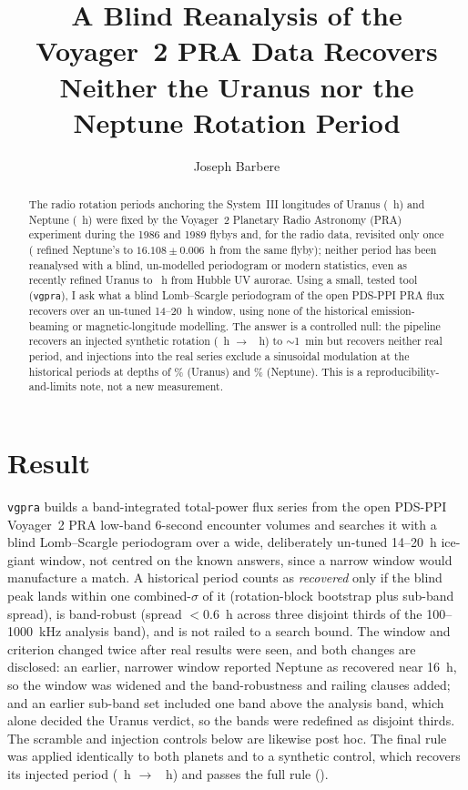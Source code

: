 \documentclass[RNAAS]{aastex631}
\newcommand{\code}[1]{\texttt{#1}}
\begin{document}
\title{A Blind Reanalysis of the Voyager~2 PRA Data Recovers Neither the Uranus nor the
Neptune Rotation Period}

\author[0009-0008-3289-4447]{Joseph Barbere}

\begin{abstract}
The radio rotation periods anchoring the System~III longitudes of Uranus
(\vgRealUHist~h) and Neptune (\vgRealNHist~h) were fixed by the Voyager~2 Planetary
Radio Astronomy (PRA) experiment during the 1986 and 1989 flybys
\citep{warwick1986,warwick1989} and, for the radio data, revisited only once
(\citealt{lecacheux1993} refined Neptune's to $16.108\pm0.006$~h from the same flyby);
neither period has been reanalysed with a blind, un-modelled periodogram or modern
statistics, even as \citet{lamy2025} recently refined Uranus to \vgRealULamy~h from
Hubble UV aurorae. Using a small,
tested tool (\code{vgpra}), I ask what a blind Lomb--Scargle periodogram of the open
PDS-PPI PRA flux \citep{pdsppi_vg2pra} recovers over an un-tuned 14--20~h window, using
none of the historical emission-beaming or magnetic-longitude modelling. The answer is
a controlled null: the pipeline recovers an injected synthetic rotation
(\vgSynInjected~h $\to$ \vgSynRecovered~h) to $\sim$1~min but recovers neither real
period, and injections into the real series exclude a sinusoidal modulation at the
historical periods at depths of \vgRealUMinDepth\% (Uranus) and \vgRealNMinDepth\% (Neptune). This is a reproducibility-and-limits note, not a new measurement.
\end{abstract}

\section{Result}

\code{vgpra} \citep{janskyresearch} builds a band-integrated total-power flux series from the
open PDS-PPI Voyager~2 PRA low-band 6-second encounter volumes \citep{pdsppi_vg2pra}
and searches it with a blind Lomb--Scargle periodogram over a wide, deliberately
un-tuned 14--20~h ice-giant window, not centred on the known answers, since a
narrow window would manufacture a match. A historical period counts as \emph{recovered}
only if the blind peak lands within one combined-$\sigma$ of it (rotation-block bootstrap
plus sub-band spread), is band-robust (spread $<0.6$~h across three disjoint thirds of the
100--1000~kHz analysis band), and is not railed to a search bound. The window and criterion
changed twice after real results were seen, and both changes are disclosed: an earlier,
narrower window reported Neptune as recovered near 16~h, so the window was widened and the
band-robustness and railing clauses added; and an earlier sub-band set included one band
above the analysis band, which alone decided the Uranus verdict, so the bands were
redefined as disjoint thirds. The scramble and injection controls below are likewise post
hoc. The final rule was applied identically to both planets and to a synthetic control, which recovers its injected period
(\vgSynInjected~h $\to$ \vgSynRecovered~h) and passes the full rule (\vgSynFullOK).
\end{document}
